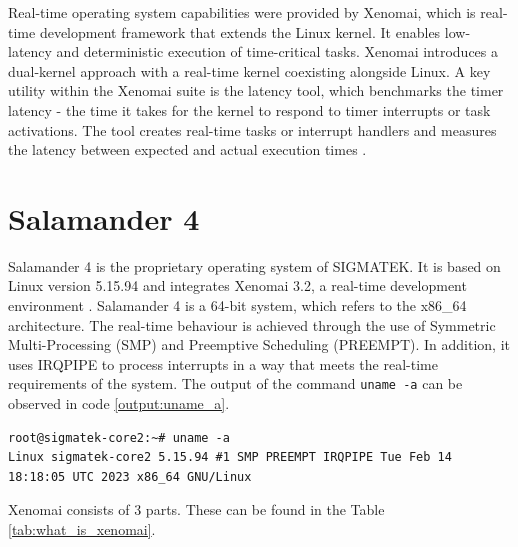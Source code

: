 \documentclass[MMR,Master,english]{twbook}
\begin{document}
\bigskip \noindent Real-time operating system capabilities were provided by Xenomai, which is real-time development framework that extends the Linux kernel. It enables low-latency and deterministic execution of time-critical tasks. Xenomai introduces a dual-kernel approach with a real-time kernel coexisting alongside Linux. A key utility within the Xenomai suite is the latency tool, which benchmarks the timer latency - the time it takes for the kernel to respond to timer interrupts or task activations. The tool creates real-time tasks or interrupt handlers and measures the latency between expected and actual execution times \cite{XenomaiXenomai}.

\clearpage

\chapter{Salamander 4}\label{cha:salamander4}

Salamander 4 is the proprietary operating system of SIGMATEK. It is based on Linux version 5.15.94 and integrates Xenomai 3.2, a real-time development environment \cite{XenomaiXenomai}. Salamander 4 is a 64-bit system, which refers to the x86\_64 architecture. The real-time behaviour is achieved through the use of Symmetric Multi-Processing (SMP) and Preemptive Scheduling (PREEMPT). In addition, it uses IRQPIPE to process interrupts in a way that meets the real-time requirements of the system. The output of the command \texttt{uname -a} can be observed in code \ref{output:uname_a}.

\vspace{1em}
\begin{minipage}{0.95\columnwidth}
	\begin{lstlisting}[name={System information},label={output:uname_a}]
root@sigmatek-core2:~# uname -a
Linux sigmatek-core2 5.15.94 #1 SMP PREEMPT IRQPIPE Tue Feb 14 18:18:05 UTC 2023 x86_64 GNU/Linux
\end{lstlisting}
\end{minipage}

Xenomai consists of 3 parts. These can be found in the Table \ref{tab:what_is_xenomai}.
\end{document}
